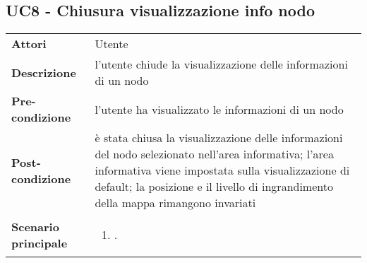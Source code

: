 \subsection{UC8 - Chiusura visualizzazione info nodo} 
\label{sssec:UC8} 
\def\arraystretch{1.5}
\begin{tabularx}{\textwidth}{l|p{}}
	\rowcolor{I} \multicolumn{2}{c}{\color{white}\textbf{UC8 - Chiusura visualizzazione info nodo}} \\
	\toprule
	\endhead
	\textbf{Attori} & Utente\\
	\textbf{Descrizione} & l'utente chiude la visualizzazione delle informazioni di un nodo\\
	\textbf{Pre-condizione} & l'utente ha visualizzato le informazioni di un nodo\\
	\textbf{Post-condizione} & è stata chiusa la visualizzazione delle informazioni del nodo selezionato nell'area informativa; l'area informativa viene impostata sulla visualizzazione di default; la posizione e il livello di ingrandimento della mappa rimangono invariati\\
	\textbf{Scenario principale} & \vspace{-1.2em}\begin{enumerate}[leftmargin=*,noitemsep,nosep]
		\item \nameref{sssec:UC8}.
	\end{enumerate}\\
	\bottomrule
\end{tabularx}
